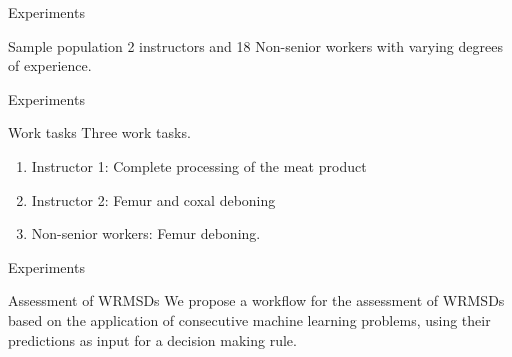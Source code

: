 \begin{frame}{Experiments}
\begin{alertblock}{Sample population}
    2 instructors and 18 Non-senior workers with varying degrees of experience.
\end{alertblock}    
\end{frame}



\begin{frame}{Experiments}
    \begin{alertblock}{Work tasks}
      Three work tasks. 
      \begin{enumerate}
          \item Instructor 1: Complete processing of the meat product
          \item Instructor 2: Femur and coxal deboning
          \item Non-senior workers: Femur deboning.
      \end{enumerate}
    \end{alertblock}
\end{frame}

\begin{frame}{Experiments}
    \begin{alertblock}{Assessment of WRMSDs}
        We propose a workflow for the assessment of WRMSDs based on the application of consecutive machine learning problems, using their predictions as input for a decision making rule.
    \end{alertblock}
\end{frame}